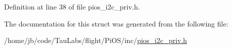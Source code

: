 \-Definition at line 38 of file pios\-\_\-i2c\-\_\-priv.\-h.



\-The documentation for this struct was generated from the following file\-:\begin{DoxyCompactItemize}
\item 
/home/jb/code/\-Tau\-Labs/flight/\-Pi\-O\-S/inc/\hyperlink{pios__i2c__priv_8h}{pios\-\_\-i2c\-\_\-priv.\-h}\end{DoxyCompactItemize}
